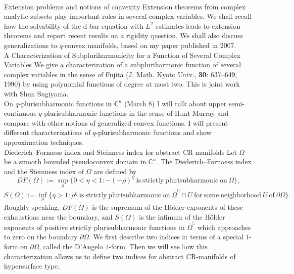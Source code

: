 \documentclass[a4]{article}
\theoremstyle{plain} %
\theoremstyle{definition} %
\begin{document}
\vskip5mm
\\
Extension problems and notions of convexity
\vskip3mm
Extension theorems from complex analytic subsets play important roles in several complex variables. We shall recall how the solvability of the d-bar equation with $L^2$ estimates leads to extension theorems and report recent results on a rigidity question. We shall also discuss generalizations to $q$-convex manifolds, based on my paper published in 2007.
\vskip5mm
\\
A Characterization of Subpluriharmonicity for a Function of Several Complex Variables
\vskip3mm
We give a characterization of a subpluriharmonic function of several complex variables
in the sense of Fujita (J. Math. Kyoto Univ., {\bf 30}: 637--649, 1990) by using polynomial
functions of degree at most two.  This is joint work with Shun Sugiyama. 
\vskip5mm
\\
On $q$-plurisubharmonic functions in $\mathbb{C}^n$ (March 8)
\vskip3mm
I will talk about upper semi-continuous $q$-plurisubharmonic functions in the sense of Hunt-Murray and compare with other notions of generalized convex functions. I will present different characterizations of $q$-plurisubharmonic functions and show approximation techniques. 
\vskip5mm
\\
Diederich--Fornaess index and Steinness index for abstract CR-manifolds
\vskip3mm
Let $\Omega$ be a smooth bounded pseudoconvex domain in $\mathbb{C}^n$. 
The Diederich--Fornaess index and the Steinness index of $\Omega$ are defined by 
\[
DF(\Omega) := \sup_\rho \{0 < \eta < 1 : -(-\rho)^\eta\ \text{is}\ \text{strictly}\ \text{plurisubharmonic}\ \text{on}\ \Omega\},
\]
\[
S(\Omega) := \inf_\rho\{\eta > 1 : \rho^\eta\ \text{is}\ \text{strictly}\ \text{plurisubharmonic}\ \text{on}\ \overline{\Omega}^{\complement}\cap U\ \text{for}\ \text{some}\ \text{neighborhood}\ U\ \text{of}\ \partial\Omega\}.
\]
Roughly speaking, $DF(\Omega)$ is the supremum of the H\"older exponents of these exhaustions near the boundary, and $S(\Omega)$ is the infimum of the H\"older exponents of positive strictly plurisubharmonic functions in $\overline\Omega^{\complement}$ which approaches to zero on the boundary $\partial\Omega$. We first describe two indices in terms of a special $1$-form on $\partial\Omega$, called the D'Angelo $1$-form. Then we will see how this characterization allows us to define two indices for abstract CR-manifolds of hypersurface type. 
\end{document}
